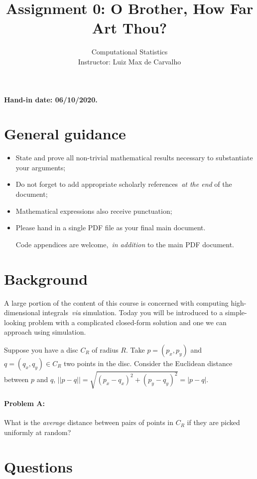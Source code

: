 \documentclass[a4paper,10pt, notitlepage]{report}
\title{Assignment 0: O Brother, How Far Art Thou?}
\author{Computational Statistics \\ Instructor: Luiz Max de Carvalho}
\begin{document}
\maketitle

\textbf{Hand-in date: 06/10/2020.}

\section*{General guidance}
\begin{itemize}
 \item State and prove all non-trivial mathematical results necessary to substantiate your arguments;
 \item Do not forget to add appropriate scholarly references~\textit{at the end} of the document;
 \item Mathematical expressions also receive punctuation;
 \item Please hand in a single PDF file as your final main document.
 
 Code appendices are welcome,~\textit{in addition} to the main PDF document.
 \end{itemize}

\newpage

\section*{Background}

A large portion of the content of this course is concerned with computing high-dimensional integrals~\textit{via} simulation.
Today you will be introduced to a simple-looking problem with a complicated closed-form solution and one we can approach using simulation.

Suppose you have a disc $C_R$ of radius $R$. 
Take $p = (p_x, p_y)$ and $ q = (q_x, q_y) \in C_R$ two points in the disc.  
Consider the Euclidean distance between $p$  and $q$, $||p-q|| = \sqrt{(p_x-q_x)^2 + (p_y-q_y)^2} = |p-q|$.
\paragraph{Problem A:} What is the \textit{average} distance between pairs of points in $C_R$ if they are picked uniformly at random?

\section*{Questions}
\end{document}

